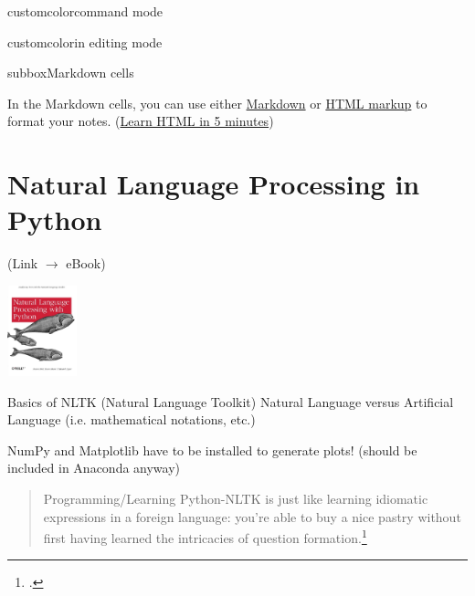 \documentclass[10pt,a4paper]{article}
\begin{document}
\begin{multicols}{3}
\begin{multibox}{2}
\begin{subbox}{customcolor}{command mode}
\end{subbox}
\end{multibox}

\begin{multibox}{2} %
\begin{subbox}{customcolor}{in editing mode}

\end{subbox}
\begin{subbox}{subbox}{Markdown cells}

\scriptsize

In the Markdown cells, you can use either \href{https://commonmark.org/help/}{Markdown} or \href{https://www.w3schools.com/html/html_intro.asp}{HTML markup} to format your notes. (\href{https://www.freecodecamp.org/news/learn-html-in-5-minutes-ccd378d2ab72/}{Learn HTML in 5 minutes})

\end{subbox}
\end{multibox}


\section{Natural Language Processing in Python}

(Link $\to$ eBook) 

\href{https://www.nltk.org/book/}{
\includegraphics[width=0.15\textwidth]{nltk-buch-python.jpg}
}

\begin{textbox}{Basics of NLTK (Natural Language Toolkit)}
Natural Language versus Artificial Language (i.e. mathematical notations, etc.)

NumPy and Matplotlib have to be installed to generate plots! (should be included in Anaconda anyway)

\begin{quote}
    \lbrack{}Programming/Learning Python-NLTK\rbrack{} is just like learning idiomatic expressions in a foreign language: you're able to buy a nice pastry without first having learned the intricacies of question formation.\footcite[xii]{pythonnltk}
\end{quote}


\end{textbox}
\end{multicols}
\end{document}

